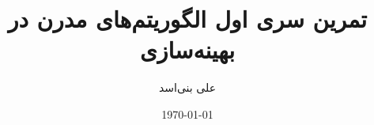 \documentclass[12pt,onecolumn,a4paper]{article}
\begin{document}
	\title{تمرین سری اول الگوریتم‌های مدرن در بهینه‌سازی} 
	\author{علی بنی‌اسد}
	\date{\today}
	\maketitle
	
	
	
\end{document}
